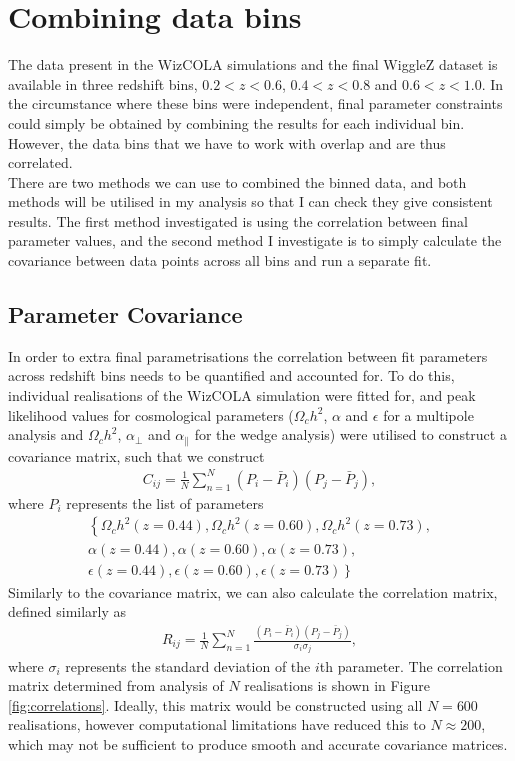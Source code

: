 \documentclass[titlesmallcaps, examinerscopy, copyrightpage]{uqthesis}
\begin{document}
\newpage \phantom{blabla} \clearpage
\section{Combining data bins}

The data present in the WizCOLA simulations and the final WiggleZ dataset is available in three redshift bins, $0.2 < z < 0.6$, $0.4 < z < 0.8$ and $0.6 < z < 1.0$. In the circumstance where these bins were independent, final parameter constraints could simply be obtained by combining the results for each individual bin. However, the data bins that we have to work with overlap and are thus correlated. \\

There are two methods we can use to combined the binned data, and both methods will be utilised in my analysis so that I can check they give consistent results. The first method investigated is using the correlation between final parameter values, and the second method I investigate is to simply calculate the covariance between data points across all bins and run a separate fit.

\subsection{Parameter Covariance} \label{sec:parameterCov}

In order to extra final parametrisations the correlation between fit parameters across redshift bins needs to be quantified and accounted for. To do this, individual realisations of the WizCOLA simulation were fitted for, and peak likelihood values for cosmological parameters ($\Omega_c h^2$, $\alpha$ and $\epsilon$ for a multipole analysis and $\Omega_c h^2$, $\alpha_\perp$ and $\alpha_\parallel$ for the wedge analysis) were utilised to construct a covariance matrix, such that we construct
\begin{align}
C_{ij} = \frac{1}{N} \sum\limits_{n=1}^{N} (P_i - \bar{P}_i)(P_j - \bar{P}_j),
\end{align}
where $P_i$ represents the list of parameters 
\begin{align*}
\left\lbrace \Omega_c h^2 (z = 0.44), \Omega_c h^2 (z = 0.60),  \Omega_c h^2 (z = 0.73), \right. \\ 
\alpha (z = 0.44), \alpha (z = 0.60),  \alpha (z = 0.73), \\
\epsilon (z = 0.44), \left. \epsilon (z = 0.60),  \epsilon (z = 0.73) \right\rbrace
\end{align*}
Similarly to the covariance matrix, we can also calculate the correlation matrix, defined similarly as
\begin{align}
R_{ij} = \frac{1}{N} \sum\limits_{n=1}^{N} \frac{(P_i - \bar{P}_i)(P_j - \bar{P}_j)}{\sigma_i \sigma_j},
\end{align}
where $\sigma_i$ represents the standard deviation of the $i$th parameter. The correlation matrix determined from analysis of $N$ realisations is shown in Figure \ref{fig:correlations}. Ideally, this matrix would be constructed using all $N=600$ realisations, however computational limitations have reduced this to $N \approx 200$, which may not be sufficient to produce smooth and accurate covariance matrices.
\end{document}
